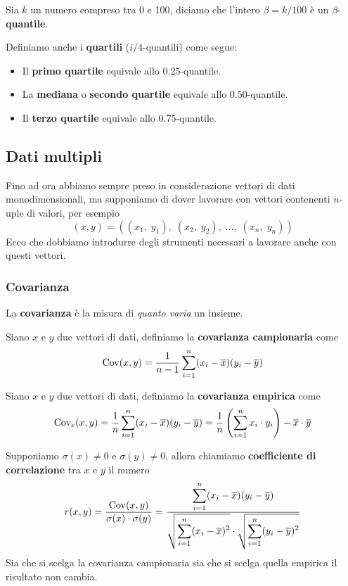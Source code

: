 \begin{definition}
	Sia $k$ un numero compreso tra 0 e 100, diciamo che l'intero $\beta = k / 100$ è un $\beta$-\textbf{quantile}.
\end{definition}

\begin{definition}
	Definiamo anche i \textbf{quartili} ($i/4$-quantili) come segue:
	\begin{itemize}
		\item Il \textbf{primo quartile} equivale allo $0.25$-quantile.
		\item La \textbf{mediana} o \textbf{secondo quartile} equivale allo $0.50$-quantile.
		\item Il \textbf{terzo quartile} equivale allo $0.75$-quantile.
	\end{itemize}
\end{definition}

\subsection{Dati multipli}
Fino ad ora abbiamo sempre preso in considerazione vettori di dati monodimensionali, ma supponiamo di dover lavorare
con vettori contenenti $n$-uple di valori, per esempio
\[ (x, y) = ((x_1, \; y_1), \; (x_2, \; y_2), \; \dots, \; (x_n, \; y_n)) \]
Ecco che dobbiamo introdurre degli strumenti necessari a lavorare anche con questi vettori.

\subsubsection{Covarianza}
La \textbf{covarianza} è la misura di \emph{quanto varia} un insieme.

\begin{definition}
	Siano $x$  e $y$ due vettori di dati, definiamo la \textbf{covarianza campionaria} come
	\[ \operatorname{Cov}(x, y) = \frac{1}{n - 1} \sum_{i=1}^n (x_i - \overline{x}) (y_i - \overline{y}) \]
\end{definition}

\begin{definition}
	Siano $x$  e $y$ due vettori di dati, definiamo la \textbf{covarianza empirica} come
	\[
		\operatorname{Cov}_e(x, y) = \frac{1}{n} \sum_{i=1}^n (x_i - \overline{x}) (y_i - \overline{y}) =
		\frac{1}{n} \left( \sum_{i=1}^n x_i \cdot y_i \right) - \overline{x} \cdot \overline{y}
	\]
\end{definition}

\begin{definition}
	Supponiamo $\sigma (x) \neq 0$ e $\sigma (y) \neq 0$, allora chiamiamo \textbf{coefficiente di correlazione} tra
	$x$ e $y$ il numero
	\[
		r(x, y) = \frac{\operatorname{Cov} (x, y)}{\sigma (x) \cdot \sigma (y)} =
		\frac{\displaystyle\sum_{i=1}^n (x_i - \overline{x})(y_i - \overline{y})}
		{\sqrt{\displaystyle\sum_{i=1}^n (x_i - \overline{x})^2} \cdot
			\sqrt{\displaystyle\sum_{i=1}^n (y_i - \overline{y})^2}}
	\]
	Sia che si scelga la covarianza campionaria sia che si scelga quella empirica il risultato non cambia.
\end{definition}

